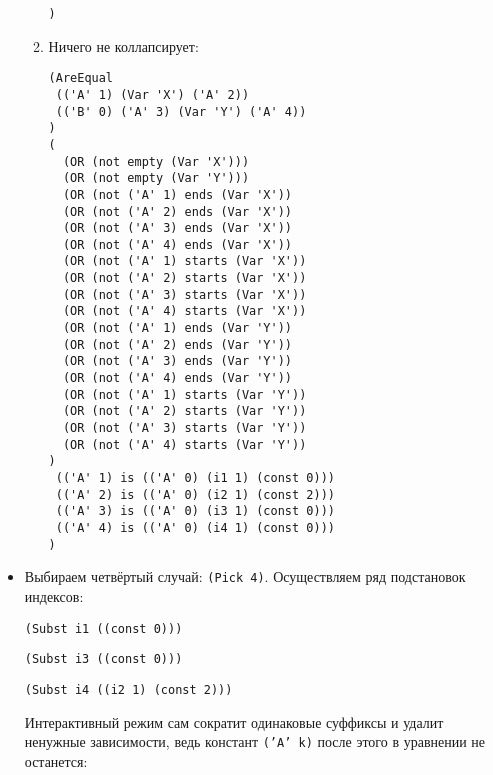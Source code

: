 \documentclass[12pt]{article}
\begin{document}
\begin{itemize}
\begin{enumerate}
\begin{verbatim}
)
\end{verbatim}
\item Ничего не коллапсирует:
\begin{verbatim}
(AreEqual 
 (('A' 1) (Var 'X') ('A' 2)) 
 (('B' 0) ('A' 3) (Var 'Y') ('A' 4))
)
(
  (OR (not empty (Var 'X')))
  (OR (not empty (Var 'Y')))
  (OR (not ('A' 1) ends (Var 'X'))
  (OR (not ('A' 2) ends (Var 'X'))
  (OR (not ('A' 3) ends (Var 'X'))
  (OR (not ('A' 4) ends (Var 'X'))
  (OR (not ('A' 1) starts (Var 'X'))
  (OR (not ('A' 2) starts (Var 'X'))
  (OR (not ('A' 3) starts (Var 'X'))
  (OR (not ('A' 4) starts (Var 'X'))
  (OR (not ('A' 1) ends (Var 'Y'))
  (OR (not ('A' 2) ends (Var 'Y'))
  (OR (not ('A' 3) ends (Var 'Y'))
  (OR (not ('A' 4) ends (Var 'Y'))
  (OR (not ('A' 1) starts (Var 'Y'))
  (OR (not ('A' 2) starts (Var 'Y'))
  (OR (not ('A' 3) starts (Var 'Y'))
  (OR (not ('A' 4) starts (Var 'Y'))
)
 (('A' 1) is (('A' 0) (i1 1) (const 0))) 
 (('A' 2) is (('A' 0) (i2 1) (const 2))) 
 (('A' 3) is (('A' 0) (i3 1) (const 0))) 
 (('A' 4) is (('A' 0) (i4 1) (const 0))) 
)
\end{verbatim}

\end{enumerate}
\item Выбираем четвёртый случай: \texttt{(Pick 4)}. Осуществляем ряд подстановок индексов: 

\texttt{(Subst i1 ((const 0)))}

\texttt{(Subst i3 ((const 0)))}

\texttt{(Subst i4 ((i2 1) (const 2)))}

Интерактивный режим сам сократит одинаковые суффиксы и удалит ненужные зависимости, ведь констант \texttt{('A' k)} после этого в уравнении не останется:


\end{itemize}
\end{document}
